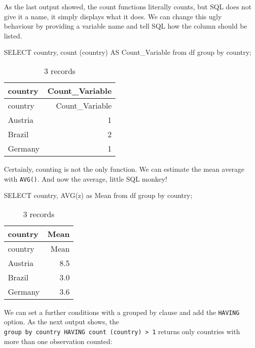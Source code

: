 \documentclass[
  letterpaper,
  DIV=11,
  numbers=noendperiod]{scrreprt}
\newenvironment{Shaded}{\begin{snugshade}}{\end{snugshade}}
\newcommand{\FunctionTok}[1]{\textcolor[rgb]{0.28,0.35,0.67}{#1}}
\newcommand{\KeywordTok}[1]{\textcolor[rgb]{0.00,0.23,0.31}{#1}}
\newcommand{\NormalTok}[1]{\textcolor[rgb]{0.00,0.23,0.31}{#1}}
\begin{document}
As the last output showed, the count functions literally counts, but SQL
does not give it a name, it simply displays what it does. We can change
this ugly behaviour by providing a variable name and tell SQL how the
column should be listed.

\begin{Shaded}
\begin{Highlighting}[]
\KeywordTok{SELECT}\NormalTok{ country, }\FunctionTok{count}\NormalTok{ (country) }\KeywordTok{AS}\NormalTok{ Count\_Variable }\KeywordTok{from}\NormalTok{ df }\KeywordTok{group} \KeywordTok{by}\NormalTok{ country;}
\end{Highlighting}
\end{Shaded}

\begin{longtable}[]{@{}lr@{}}
\caption{3 records}\tabularnewline
\toprule()
country & Count\_Variable \\
\midrule()
\endfirsthead
\toprule()
country & Count\_Variable \\
\midrule()
\endhead
Austria & 1 \\
Brazil & 2 \\
Germany & 1 \\
\bottomrule()
\end{longtable}

Certainly, counting is not the only function. We can estimate the mean
average with \texttt{AVG()}. And now the average, little SQL monkey!

\begin{Shaded}
\begin{Highlighting}[]
\KeywordTok{SELECT}\NormalTok{ country, }\FunctionTok{AVG}\NormalTok{(z) }\KeywordTok{as}\NormalTok{ Mean }\KeywordTok{from}\NormalTok{ df }\KeywordTok{group} \KeywordTok{by}\NormalTok{ country;}
\end{Highlighting}
\end{Shaded}

\begin{longtable}[]{@{}lr@{}}
\caption{3 records}\tabularnewline
\toprule()
country & Mean \\
\midrule()
\endfirsthead
\toprule()
country & Mean \\
\midrule()
\endhead
Austria & 8.5 \\
Brazil & 3.0 \\
Germany & 3.6 \\
\bottomrule()
\end{longtable}

We can set a further conditions with a grouped by clause and add the
\texttt{HAVING} option. As the next output shows, the
\texttt{group\ by\ country\ HAVING\ count\ (country)\ \textgreater{}\ 1}
returns only countries with more than one observation counted:
\end{document}
